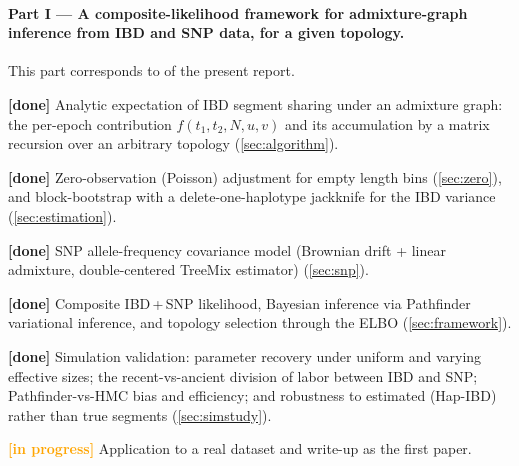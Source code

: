 \documentclass[12pt]{article}
\theoremstyle{definition}
\theoremstyle{definition}
\theoremstyle{lemma}
\theoremstyle{remark}
\theoremstyle{definition}
\begin{document}
\paragraph{Part I --- A composite-likelihood framework for admixture-graph
inference from IBD and SNP data, for a given topology.}
This part corresponds to  of the present report.
\begin{compactitem}
  \item \textcolor{codegreen}{\textbf{[done]}} Analytic expectation of IBD
  segment sharing under an admixture graph: the per-epoch contribution
  $f(t_1,t_2,N,u,v)$ and its accumulation by a matrix recursion over an arbitrary
  topology (\cref{sec:algorithm}).
  \item \textcolor{codegreen}{\textbf{[done]}} Zero-observation (Poisson)
  adjustment for empty length bins (\cref{sec:zero}), and block-bootstrap with a
  delete-one-haplotype jackknife for the IBD variance (\cref{sec:estimation}).
  \item \textcolor{codegreen}{\textbf{[done]}} SNP allele-frequency covariance
  model (Brownian drift + linear admixture, double-centered TreeMix estimator)
  (\cref{sec:snp}).
  \item \textcolor{codegreen}{\textbf{[done]}} Composite IBD\,+\,SNP likelihood,
  Bayesian inference via Pathfinder variational inference, and topology selection
  through the ELBO (\cref{sec:framework}).
  \item \textcolor{codegreen}{\textbf{[done]}} Simulation validation: parameter
  recovery under uniform and varying effective sizes; the recent-vs-ancient
  division of labor between IBD and SNP; Pathfinder-vs-HMC bias and efficiency;
  and robustness to estimated (Hap-IBD) rather than true segments
  (\cref{sec:simstudy}).
  \item \textcolor{orange}{\textbf{[in progress]}} Application to a real dataset
  and write-up as the first paper.
\end{compactitem}
\end{document}
